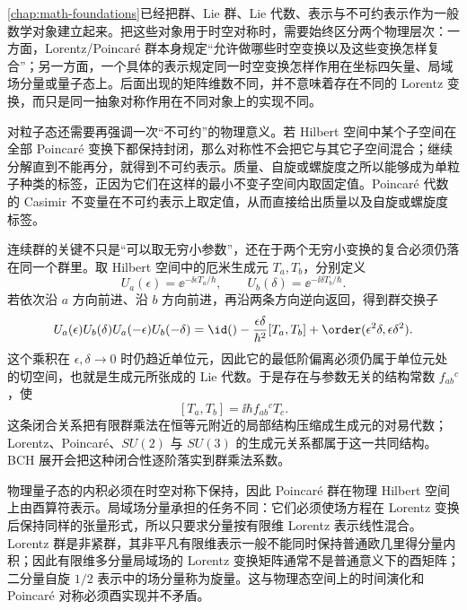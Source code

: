 \cref{chap:math-foundations}已经把群、Lie 群、Lie 代数、表示与不可约表示作为一般数学对象建立起来。把这些对象用于时空对称时，需要始终区分两个物理层次：一方面，Lorentz/Poincar\'e 群本身规定“允许做哪些时空变换以及这些变换怎样复合”；另一方面，一个具体的表示规定同一时空变换怎样作用在坐标四矢量、局域场分量或量子态上。后面出现的矩阵维数不同，并不意味着存在不同的 Lorentz 变换，而只是同一抽象对称作用在不同对象上的实现不同。

对粒子态还需要再强调一次“不可约”的物理意义。若 Hilbert 空间中某个子空间在全部 Poincar\'e 变换下都保持封闭，那么对称性不会把它与其它子空间混合；继续分解直到不能再分，就得到不可约表示。质量、自旋或螺旋度之所以能够成为单粒子种类的标签，正因为它们在这样的最小不变子空间内取固定值。Poincar\'e 代数的 Casimir 不变量在不可约表示上取定值，从而直接给出质量以及自旋或螺旋度标签。


连续群的关键不只是“可以取无穷小参数”，还在于两个无穷小变换的复合必须仍落在同一个群里。取 Hilbert 空间中的厄米生成元 $T_a,T_b$，分别定义
\begin{equation*}
 U_a(\epsilon)=\ee^{-\ii\epsilon T_a/\hbar},
 \qquad
 U_b(\delta)=\ee^{-\ii\delta T_b/\hbar}.
\end{equation*}
若依次沿 $a$ 方向前进、沿 $b$ 方向前进，再沿两条方向逆向返回，得到群交换子
\begin{equation}
{
 U_a(\epsilon)U_b(\delta)U_a(-\epsilon)U_b(-\delta)
 =\id()-\frac{\epsilon\delta}{\hbar^2}[T_a,T_b]
 +\order(\epsilon^2\delta,\epsilon\delta^2).}
\label{eq:group-commutator-bch-dp8}
\end{equation}
这个乘积在 $\epsilon,\delta\to0$ 时仍趋近单位元，因此它的最低阶偏离必须仍属于单位元处的切空间，也就是生成元所张成的 Lie 代数。于是存在与参数无关的结构常数 $f_{ab}{}^c$，使
\begin{equation}
{
 [T_a,T_b]=\ii\hbar f_{ab}{}^cT_c.}
\label{eq:lie-algebra-closure-dp68}
\end{equation}
这条闭合关系把有限群乘法在恒等元附近的局部结构压缩成生成元的对易代数；Lorentz、Poincar\'e、$SU(2)$ 与 $SU(3)$ 的生成元关系都属于这一共同结构。BCH 展开会把这种闭合性逐阶落实到群乘法系数。

\begin{note}[两种表示中的“酉”]
物理量子态的内积必须在时空对称下保持，因此 Poincar\'e 群在物理 Hilbert 空间上由酉算符表示。局域场分量承担的任务不同：它们必须使场方程在 Lorentz 变换后保持同样的张量形式，所以只要求分量按有限维 Lorentz 表示线性混合。Lorentz 群是非紧群，其非平凡有限维表示一般不能同时保持普通欧几里得分量内积；因此有限维多分量局域场的 Lorentz 变换矩阵通常不是普通意义下的酉矩阵；二分量自旋 $1/2$ 表示中的场分量称为旋量。这与物理态空间上的时间演化和 Poincar\'e 对称必须酉实现并不矛盾。
\end{note}
